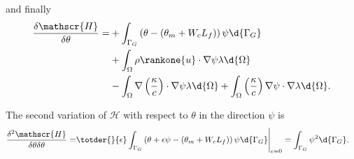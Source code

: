 and finally
\begin{align*}
 \frac{\delta \mathscr{H}}{\delta \theta} = 
 &+ \int_{\Gamma_G} \left( \theta - \left(\theta_m + W_c L_f\right) \right) \psi \d{\Gamma_G} \\
  &+ \int_{\Omega} \rho \rankone{u} \cdot \nabla \psi \lambda \d{\Omega} \\
  &- \int_{\Omega} \nabla \left( \frac{\kappa}{c} \right) \cdot \nabla \psi \lambda \d{\Omega} 
  + \int_{\Omega} \left( \frac{\kappa}{c} \right) \nabla \psi \cdot \nabla \lambda \d{\Omega}.
\end{align*}

The second variation of $\mathscr{H}$ with respect to $\theta$ in the direction $\psi$ is
\begin{align*}
 \frac{\delta^2 \mathscr{H}}{\delta \theta \delta \theta} = 
 & \totder{}{\epsilon} \int_{\Gamma_G} \left( \theta + \epsilon \psi - \left(\theta_m + W_c L_f\right) \right) \psi \d{\Gamma_G} \Bigg|_{\epsilon = 0} 
 = \int_{\Gamma_G} \psi^2 \d{\Gamma_G}.
\end{align*}

